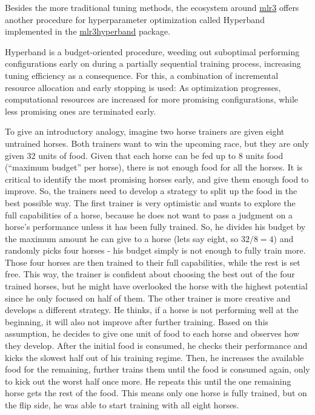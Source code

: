 \documentclass[
]{scrbook}
\begin{document}
Besides the more traditional tuning methods, the ecosystem around \href{https://mlr3.mlr-org.com}{mlr3} offers another procedure for hyperparameter optimization called Hyperband implemented in the \href{https://mlr3hyperband.mlr-org.com}{mlr3hyperband} package.

Hyperband is a budget-oriented procedure, weeding out suboptimal performing configurations early on during a partially sequential training process, increasing tuning efficiency as a consequence.
For this, a combination of incremental resource allocation and early stopping is used: As optimization progresses, computational resources are increased for more promising configurations, while less promising ones are terminated early.

To give an introductory analogy, imagine two horse trainers are given eight untrained horses.
Both trainers want to win the upcoming race, but they are only given 32 units of food.
Given that each horse can be fed up to 8 units food (``maximum budget'' per horse), there is not enough food for all the horses.
It is critical to identify the most promising horses early, and give them enough food to improve.
So, the trainers need to develop a strategy to split up the food in the best possible way.
The first trainer is very optimistic and wants to explore the full capabilities of a horse, because he does not want to pass a judgment on a horse's performance unless it has been fully trained.
So, he divides his budget by the maximum amount he can give to a horse (lets say eight, so \(32 / 8 = 4\)) and randomly picks four horses - his budget simply is not enough to fully train more.
Those four horses are then trained to their full capabilities, while the rest is set free.
This way, the trainer is confident about choosing the best out of the four trained horses, but he might have overlooked the horse with the highest potential since he only focused on half of them.
The other trainer is more creative and develops a different strategy.
He thinks, if a horse is not performing well at the beginning, it will also not improve after further training.
Based on this assumption, he decides to give one unit of food to each horse and observes how they develop.
After the initial food is consumed, he checks their performance and kicks the slowest half out of his training regime.
Then, he increases the available food for the remaining, further trains them until the food is consumed again, only to kick out the worst half once more.
He repeats this until the one remaining horse gets the rest of the food.
This means only one horse is fully trained, but on the flip side, he was able to start training with all eight horses.
\end{document}
